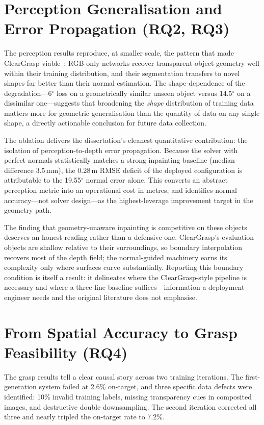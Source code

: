 \section{Perception Generalisation and Error Propagation (RQ2, RQ3)}
\label{sec:disc_rq23}

The perception results reproduce, at smaller scale, the pattern that made ClearGrasp viable~\citep{sajjan2020}: RGB-only networks recover transparent-object geometry well within their training distribution, and their segmentation transfers to novel shapes far better than their normal estimation. The shape-dependence of the degradation---6$^{\circ}$ loss on a geometrically similar unseen object versus 14.5$^{\circ}$ on a dissimilar one---suggests that broadening the \emph{shape} distribution of training data matters more for geometric generalisation than the quantity of data on any single shape, a directly actionable conclusion for future data collection.

The ablation delivers the dissertation's cleanest quantitative contribution: the isolation of perception-to-depth error propagation. Because the solver with perfect normals statistically matches a strong inpainting baseline (median difference 3.5\,mm), the 0.28\,m RMSE deficit of the deployed configuration is attributable to the 19.55$^{\circ}$ normal error alone. This converts an abstract perception metric into an operational cost in metres, and identifies normal accuracy---not solver design---as the highest-leverage improvement target in the geometry path.

The finding that geometry-unaware inpainting is competitive on these objects deserves an honest reading rather than a defensive one. ClearGrasp's evaluation objects are shallow relative to their surroundings, so boundary interpolation recovers most of the depth field; the normal-guided machinery earns its complexity only where surfaces curve substantially. Reporting this boundary condition is itself a result: it delineates where the ClearGrasp-style pipeline is necessary and where a three-line baseline suffices---information a deployment engineer needs and the original literature does not emphasise.

 
\section{From Spatial Accuracy to Grasp Feasibility (RQ4)}
\label{sec:disc_rq4}
 
The grasp results tell a clear causal story across two training iterations.
The first-generation system failed at 2.6\% on-target, and three specific
data defects were identified: 10\% invalid training labels, missing
transparency cues in composited images, and destructive double
downsampling. The second iteration corrected all three and nearly tripled
the on-target rate to 7.2\%.
 
